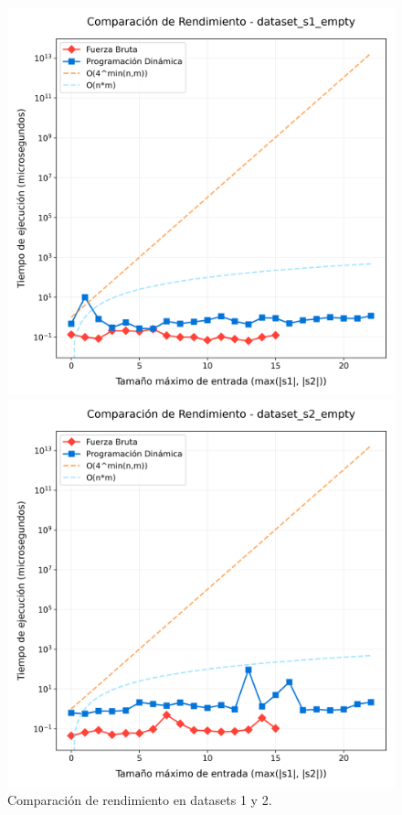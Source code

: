\begin{figure}[H]
    \centering
    \begin{minipage}[t]{0.5\textwidth}
        \includegraphics[width=\textwidth]{images/comparacion_dataset_s1_empty.png}
    \end{minipage}%
    \begin{minipage}[t]{0.5\textwidth}
        \includegraphics[width=\textwidth]{images/comparacion_dataset_s2_empty.png}   \end{minipage}%
    \caption{Comparación de rendimiento en datasets 1 y 2.}
    \label{fig:dataset1_2}
\end{figure}

